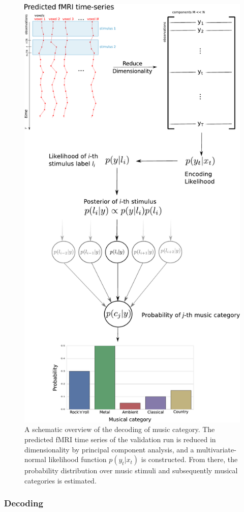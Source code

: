 \begin{figure}
  \centering
  \includegraphics[width=.8\linewidth]{pics/decoding_scheme.pdf}

  \caption{A schematic overview of the decoding of music category. The
    predicted f{MRI} time series of the validation run is reduced in
    dimensionality by principal component analysis, and a multivariate-normal
    likelihood function $p(y_{t}|x_{t})$ is constructed.  From there, the
  probability distribution over music stimuli and subsequently musical
categories is estimated.}

 \label{fig:decoding_scheme}
\end{figure}


\subsubsection*{Decoding}

